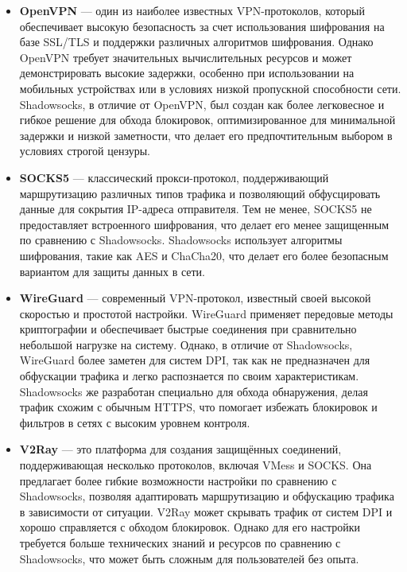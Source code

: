 \documentclass{SCWorks}
\begin{document}
\begin{itemize}
    \item \textbf{OpenVPN} --- один из наиболее известных VPN-протоколов, который обеспечивает высокую безопасность за счет использования шифрования на базе SSL/TLS и поддержки различных алгоритмов шифрования. Однако OpenVPN требует значительных вычислительных ресурсов и может демонстрировать высокие задержки, особенно при использовании на мобильных устройствах или в условиях низкой пропускной способности сети. Shadowsocks, в отличие от OpenVPN, был создан как более легковесное и гибкое решение для обхода блокировок, оптимизированное для минимальной задержки и низкой заметности, что делает его предпочтительным выбором в условиях строгой цензуры.

    \item \textbf{SOCKS5} --- классический прокси-протокол, поддерживающий маршрутизацию различных типов трафика и позволяющий обфусцировать данные для сокрытия IP-адреса отправителя. Тем не менее, SOCKS5 не предоставляет встроенного шифрования, что делает его менее защищенным по сравнению с Shadowsocks. Shadowsocks использует алгоритмы шифрования, такие как AES и ChaCha20, что делает его более безопасным вариантом для защиты данных в сети.

    \item \textbf{WireGuard} --- современный VPN-протокол, известный своей высокой скоростью и простотой настройки. WireGuard применяет передовые методы криптографии и обеспечивает быстрые соединения при сравнительно небольшой нагрузке на систему. Однако, в отличие от Shadowsocks, WireGuard более заметен для систем DPI, так как не предназначен для обфускации трафика и легко распознается по своим характеристикам. Shadowsocks же разработан специально для обхода обнаружения, делая трафик схожим с обычным HTTPS, что помогает избежать блокировок и фильтров в сетях с высоким уровнем контроля.

    \item \textbf{V2Ray} --- это платформа для создания защищённых соединений, поддерживающая несколько протоколов, включая VMess и SOCKS. Она предлагает более гибкие возможности настройки по сравнению с Shadowsocks, позволяя адаптировать маршрутизацию и обфускацию трафика в зависимости от ситуации. V2Ray может скрывать трафик от систем DPI и хорошо справляется с обходом блокировок. Однако для его настройки требуется больше технических знаний и ресурсов по сравнению с Shadowsocks, что может быть сложным для пользователей без опыта.
\end{itemize}
\end{document}
